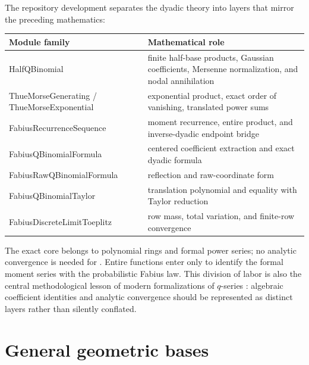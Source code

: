 \documentclass[11pt,oneside,openany]{book}
\theoremstyle{definition}
\theoremstyle{remark}
\begin{document}
The repository development separates the dyadic theory into layers that mirror the preceding mathematics:
\begin{center}
\begin{tabularx}{0.94\textwidth}{>{\ttfamily\raggedright\arraybackslash}p{}>{\raggedright\arraybackslash}X}
\toprule
\normalfont Module family & Mathematical role\\
\midrule
HalfQBinomial & finite half-base products, Gaussian coefficients, Mersenne normalization, and nodal annihilation\\
ThueMorseGenerating / ThueMorseExponential & exponential product, exact order of vanishing, translated power sums\\
FabiusRecurrenceSequence & moment recurrence, entire product, and inverse-dyadic endpoint bridge\\
FabiusQBinomialFormula & centered coefficient extraction and exact dyadic formula\\
FabiusRawQBinomialFormula & reflection and raw-coordinate form\\
FabiusQBinomialTaylor & translation polynomial and equality with Taylor reduction\\
FabiusDiscreteLimitToeplitz & row mass, total variation, and finite-row convergence\\
\bottomrule
\end{tabularx}
\end{center}

The exact core belongs to polynomial rings and formal power series; no analytic convergence is needed for .  Entire functions enter only to identify the formal moment series with the probabilistic Fabius law.  This division of labor is also the central methodological lesson of modern formalizations of $q$-series \cite{LauLeeOno2026}: algebraic coefficient identities and analytic convergence should be represented as distinct layers rather than silently conflated.

\section{General geometric bases}
\end{document}
